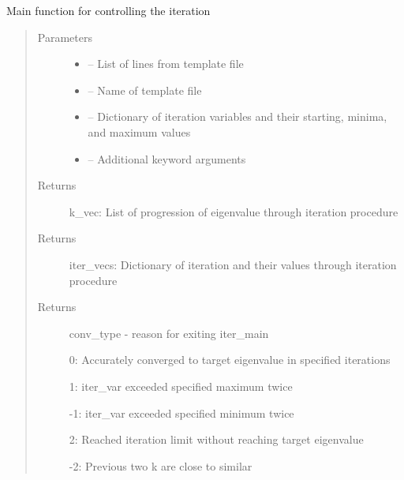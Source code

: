 \documentclass[letterpaper,10pt,english]{sphinxmanual}
\begin{document}
\begin{fulllineitems}
\label{\detokenize{iterator:critops.iterator.itermain}}
Main function for controlling the iteration
\begin{quote}\begin{description}
\item[{Parameters}] \leavevmode\begin{itemize}
\item {} 
 -- List of lines from template file

\item {} 
 -- Name of template file

\item {} 
 -- Dictionary of iteration variables and their starting, minima, and maximum values

\item {} 
 -- Additional keyword arguments

\end{itemize}

\item[{Returns}] \leavevmode
k\_vec: List of progression of eigenvalue through iteration procedure

\item[{Returns}] \leavevmode
iter\_vecs: Dictionary of iteration and their values through iteration procedure

\item[{Returns}] \leavevmode

conv\_type - reason for exiting iter\_main

0: Accurately converged to target eigenvalue in specified iterations

1: iter\_var exceeded specified maximum twice

-1: iter\_var exceeded specified minimum twice

2: Reached iteration limit without reaching target eigenvalue

-2: Previous two k are close to similar


\end{description}\end{quote}

\end{fulllineitems}
\end{document}
